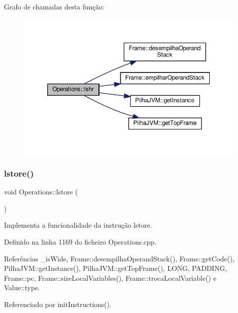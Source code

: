 Grafo de chamadas desta função\+:
\nopagebreak
\begin{figure}[H]
\begin{center}
\leavevmode
\includegraphics[width=350pt]{classOperations_aa886b0d027fb5b030016af6100541e81_cgraph}
\end{center}
\end{figure}
\mbox{\label{classOperations_a233917ec136fa6ce064f04b410e15f87}} 
\subsubsection{\texorpdfstring{lstore()}{lstore()}}
{\footnotesize\ttfamily void Operations\+::lstore (\begin{DoxyParamCaption}{ }\end{DoxyParamCaption})\hspace{0.3cm}{\ttfamily [private]}}



Implementa a funcionalidade da instrução lstore. 



Definido na linha 1169 do ficheiro Operations.\+cpp.



Referências \+\_\+is\+Wide, Frame\+::desempilha\+Operand\+Stack(), Frame\+::get\+Code(), Pilha\+J\+V\+M\+::get\+Instance(), Pilha\+J\+V\+M\+::get\+Top\+Frame(), L\+O\+NG, P\+A\+D\+D\+I\+NG, Frame\+::pc, Frame\+::size\+Local\+Variables(), Frame\+::troca\+Local\+Variable() e Value\+::type.



Referenciado por init\+Instructions().

